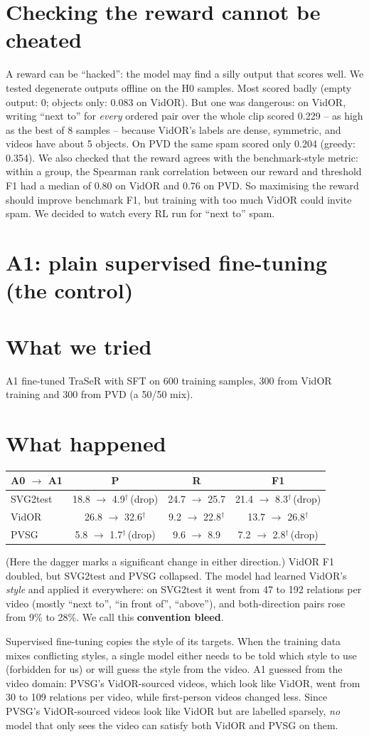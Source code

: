 \documentclass[11pt,openany]{book}
\newcommand{\sig}{\ensuremath{^\dagger}}
\newcommand{\tsec}{\section*{What we tried}}
\newcommand{\hsec}{\section*{What happened}}
\begin{document}
\section{Checking the reward cannot be cheated}
A reward can be ``hacked'': the model may find a silly output that scores well. We tested degenerate outputs offline on the H0
samples. Most scored badly (empty output: 0; objects only: 0.083 on VidOR). But one was dangerous: on VidOR, writing ``next to'' for
\emph{every} ordered pair over the whole clip scored 0.229 -- as high as the best of 8 samples -- because VidOR's labels are dense,
symmetric, and videos have about 5 objects. On PVD the same spam scored only 0.204 (greedy: 0.354). We also checked that the reward
agrees with the benchmark-style metric: within a group, the Spearman rank correlation between our reward and threshold F1 had a
median of 0.80 on VidOR and 0.76 on PVD. So maximising the reward should improve benchmark F1, but training with too much VidOR
could invite spam. We decided to watch every RL run for ``next to'' spam.

\section{A1: plain supervised fine-tuning (the control)}
\tsec
A1 fine-tuned TraSeR with SFT on 600 training samples, 300 from VidOR training and 300 from PVD (a 50/50 mix).

\hsec
\begin{center}
\begin{tabular}{@{}lccc@{}}
\toprule
A0 $\to$ A1 & P & R & F1 \\
\midrule
SVG2test & 18.8 $\to$ 4.9\sig\,(drop) & 24.7 $\to$ 25.7 & 21.4 $\to$ 8.3\sig\,(drop) \\
VidOR & 26.8 $\to$ 32.6\sig & 9.2 $\to$ 22.8\sig & 13.7 $\to$ 26.8\sig \\
PVSG & 5.8 $\to$ 1.7\sig\,(drop) & 9.6 $\to$ 8.9 & 7.2 $\to$ 2.8\sig\,(drop) \\
\bottomrule
\end{tabular}
\end{center}
(Here the dagger marks a significant change in either direction.) VidOR F1 doubled, but SVG2test and PVSG collapsed. The model had
learned VidOR's \emph{style} and applied it everywhere: on SVG2test it went from 47 to 192 relations per video (mostly ``next to'',
``in front of'', ``above''), and both-direction pairs rose from 9\% to 28\%. We call this \textbf{convention bleed}.

\begin{keyidea}
Supervised fine-tuning copies the style of its targets. When the training data mixes conflicting styles, a single model either
needs to be told which style to use (forbidden for us) or will guess the style from the video. A1 guessed from the video domain:
PVSG's VidOR-sourced videos, which look like VidOR, went from 30 to 109 relations per video, while first-person videos changed less.
Since PVSG's VidOR-sourced videos look like VidOR but are labelled sparsely, \emph{no} model that only sees the video can satisfy both
VidOR and PVSG on them.
\end{keyidea}
\end{document}
